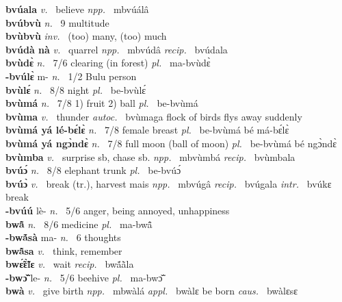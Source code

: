 {\bfseries bvúala}  {\itshape v.~} believe   {\itshape npp.~} mbvúálâ  \\ 
{\bfseries bvúbvù}  {\itshape n.~} 9 multitude    \\ 
{\bfseries bvùbvù}  {\itshape inv.~} (too) many, (too) much    \\ 
{\bfseries bvúdà nà}  {\itshape v.~} quarrel   {\itshape npp.~} mbvúdâ {\itshape recip.~} bvúdala  \\ 
{\bfseries bvùdɛ̀}  {\itshape n.~} 7/6 clearing (in forest) {\itshape pl.~} ma-bvùdɛ̀    \\ 
{\bfseries -bvúlɛ̀} m- {\itshape n.~} 1/2 Bulu person    \\ 
{\bfseries bvùlɛ́}  {\itshape n.~} 8/8 night {\itshape pl.~} be-bvùlɛ́    \\ 
{\bfseries bvùmá}  {\itshape n.~} 7/8 1) fruit 2) ball {\itshape pl.~} be-bvùmá    \\ 
{\bfseries bvùma}  {\itshape v.~} thunder   {\itshape autoc.~} bvùmaga flock of birds flys away suddenly  \\ 
{\bfseries bvùmá yá lé-bɛ́lɛ̀}  {\itshape n.~} 7/8 female breast  {\itshape pl.~} be-bvùmá bé má-bɛ́lɛ̀ \\ 
{\bfseries bvùmá yá ngɔ̀ndɛ̀}  {\itshape n.~} 7/8 full moon (ball of moon) {\itshape pl.~} be-bvùmá bé ngɔ̀ndɛ̀    \\ 
{\bfseries bvùmba}  {\itshape v.~} surprise sb, chase sb.   {\itshape npp.~} mbvùmbá {\itshape recip.~} bvùmbala  \\ 
{\bfseries bvúɔ́}  {\itshape n.~} 8/8 elephant trunk {\itshape pl.~} be-bvúɔ́    \\ 
{\bfseries bvúɔ̀}  {\itshape v.~} break (tr.), harvest mais   {\itshape npp.~} mbvúgâ {\itshape recip.~} bvúgala {\itshape intr.~} bvúkɛ break  \\ 
{\bfseries -bvúú} lè- {\itshape n.~} 5/6 anger, being annoyed, unhappiness    \\ 
{\bfseries bwã̂}  {\itshape n.~} 8/6 medicine {\itshape pl.~} ma-bwã̂    \\ 
{\bfseries -bwã́sà} ma- {\itshape n.~} 6 thoughts \\ 
{\bfseries bwã̂sa}  {\itshape v.~} think, remember    \\ 
{\bfseries bwɛ̃́ɛ̃̀lɛ}  {\itshape v.~} wait   {\itshape recip.~} bwã́ã̀la  \\ 
{\bfseries -bwɔ̃̌} le- {\itshape n.~} 5/6 beehive {\itshape pl.~} ma-bwɔ̃̌   \\ 
{\bfseries bwà}  {\itshape v.~} give birth   {\itshape npp.~} mbwàlá {\itshape appl.~} bwàlɛ be born {\itshape caus.~} bwàlɛsɛ  \\ 
